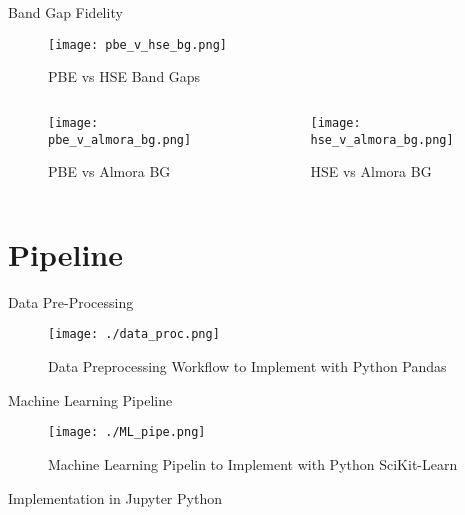 \documentclass[10pt, compress]{beamer}
\begin{document}
\begin{frame}[allowframebreaks]{Band Gap Fidelity}
\begin{figure}[htbp]
\centering
\texttt{[image: pbe\_v\_hse\_bg.png]}
\caption{PBE vs HSE Band Gaps}
\end{figure}
\cite{almora-2020-devic-perfor}
\begin{columns}
\begin{column}{0.4\columnwidth}
\begin{figure}[htbp]
\centering
\texttt{[image: pbe\_v\_almora\_bg.png]}
\caption{PBE vs Almora BG}
\end{figure}
\end{column}
\begin{column}{0.6\columnwidth}
\begin{figure}[htbp]
\centering
\texttt{[image: hse\_v\_almora\_bg.png]}
\caption{HSE vs Almora BG}
\end{figure}
\end{column}
\end{columns}
\end{frame}
\section{Pipeline}
\label{sec:orgae04cd6}
\begin{frame}[label={sec:org11880e9}]{Data Pre-Processing}
\begin{figure}[htbp]
\centering
\texttt{[image: ./data\_proc.png]}
\caption{Data Preprocessing Workflow to Implement with Python Pandas}
\end{figure}
\end{frame}

\begin{frame}[label={sec:org9eede57}]{Machine Learning Pipeline}
\begin{figure}[htbp]
\centering
\texttt{[image: ./ML\_pipe.png]}
\caption{Machine Learning Pipelin to Implement with Python SciKit-Learn}
\end{figure}
\end{frame}

\begin{frame}[allowframebreaks]{Implementation in Jupyter Python}
\small

\end{frame}
\end{document}
